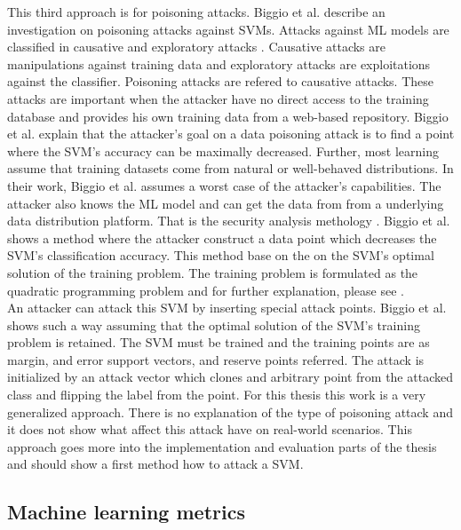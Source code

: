 This third approach is for poisoning attacks. Biggio et al. \cite{DBLP:conf/icml/BiggioNL12} describe an investigation on poisoning attacks against SVMs. Attacks against ML models are classified in causative and exploratory attacks \cite{DBLP:conf/ccs/BarrenoNSJT06}. Causative attacks are manipulations against training data and exploratory attacks are exploitations against the classifier. Poisoning attacks are refered to causative attacks. These attacks are important when the attacker have no direct access to the training database and provides his own training data from a web-based repository. Biggio et al. explain that the attacker's goal on a data poisoning attack is to find a point where the SVM's accuracy can be maximally decreased. Further, most learning assume that training datasets come from natural or well-behaved distributions. In their work, Biggio et al. assumes a worst case of the attacker's capabilities. The attacker also knows the ML model and can get the data from from a underlying data distribution platform. That is the security analysis methology \cite{DBLP:journals/ml/BarrenoNJT10}. Biggio et al. shows a method where the attacker construct a data point which decreases the SVM's classification accuracy. This method base on the on the SVM's optimal solution of the training problem. The training problem is formulated as the quadratic
programming problem and for further explanation, please see \cite{Papadonikolakis2009PerformanceCO}. \\
An attacker can attack this SVM by inserting special attack points. Biggio et al. shows such a way assuming that the optimal solution of the SVM's training problem is retained. The SVM must be trained and the training points are as margin, and error support vectors, and reserve points referred. The attack is initialized by an attack vector which clones and arbitrary point from the attacked class and flipping the label \cite{DBLP:journals/apin/ZhangCZL21} from the point. For this thesis this work is a very generalized approach. There is no explanation of the type of poisoning attack and it does not show what affect this attack have on real-world scenarios. This approach goes more into the implementation and evaluation parts of the thesis and should show a first method how to attack a SVM.

\subsection{Machine learning metrics}
\label{sec:ml_metrics}

